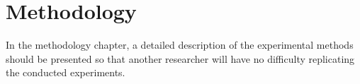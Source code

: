 \chapter{Methodology}
In the methodology chapter, a detailed description of the experimental methods should be presented so that another researcher will have no difficulty replicating the conducted experiments.

